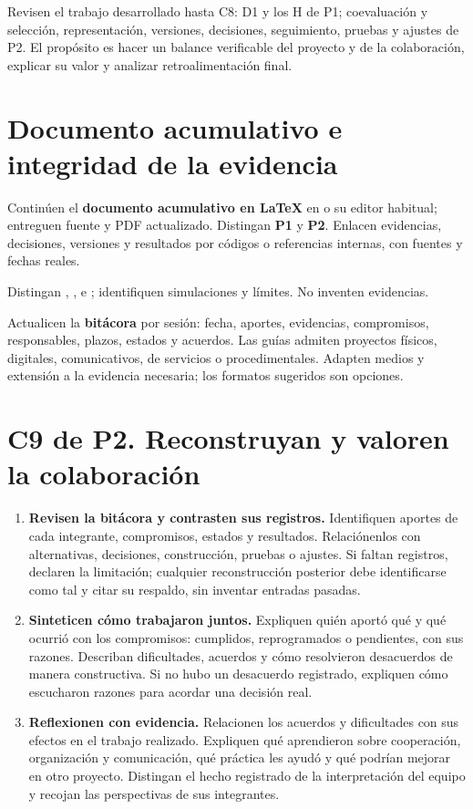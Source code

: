 Revisen el trabajo desarrollado hasta C8: D1 y los H de P1; coevaluación y selección, representación, versiones, decisiones, seguimiento, pruebas y ajustes de P2. El propósito es hacer un balance verificable del proyecto y de la colaboración, explicar su valor y analizar retroalimentación final.

\section*{Documento acumulativo e integridad de la evidencia}
Continúen el \textbf{documento acumulativo en LaTeX} en  o su editor habitual; entreguen fuente y PDF actualizado. Distingan \textbf{P1} y \textbf{P2}. Enlacen evidencias, decisiones, versiones y resultados por códigos o referencias internas, con fuentes y fechas reales.

Distingan , ,  e ; identifiquen simulaciones y límites.  No inventen evidencias.

Actualicen la \textbf{bitácora} por sesión: fecha, aportes, evidencias, compromisos, responsables, plazos, estados y acuerdos. Las guías admiten proyectos físicos, digitales, comunicativos, de servicios o procedimentales. Adapten medios y extensión a la evidencia necesaria; los formatos sugeridos son opciones.

\section*{C9 de P2. Reconstruyan y valoren la colaboración}
\begin{enumerate}[series=pasos]
\item \textbf{Revisen la bitácora y contrasten sus registros.} Identifiquen aportes de cada integrante, compromisos, estados y resultados. Relaciónenlos con alternativas, decisiones, construcción, pruebas o ajustes. Si faltan registros, declaren la limitación; cualquier reconstrucción posterior debe identificarse como tal y citar su respaldo, sin inventar entradas pasadas.
\item \textbf{Sinteticen cómo trabajaron juntos.} Expliquen quién aportó qué y qué ocurrió con los compromisos: cumplidos, reprogramados o pendientes, con sus razones. Describan dificultades, acuerdos y cómo resolvieron desacuerdos de manera constructiva. Si no hubo un desacuerdo registrado, expliquen cómo escucharon razones para acordar una decisión real.
\item \textbf{Reflexionen con evidencia.} Relacionen los acuerdos y dificultades con sus efectos en el trabajo realizado. Expliquen qué aprendieron sobre cooperación, organización y comunicación, qué práctica les ayudó y qué podrían mejorar en otro proyecto. Distingan el hecho registrado de la interpretación del equipo y recojan las perspectivas de sus integrantes.
\end{enumerate}

